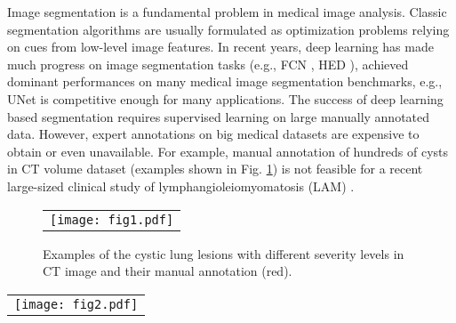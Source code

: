\documentclass{article}
\begin{document}
Image segmentation is a fundamental problem in medical image analysis. Classic segmentation algorithms \cite{sonka2014image} are usually formulated as optimization problems relying on cues from low-level image features. %
In recent years, deep learning has made much progress on image segmentation tasks (e.g., FCN \cite{long2015fully}, HED \cite{xie2015holistically}), achieved dominant performances on many medical image segmentation benchmarks, e.g., UNet \cite{ronneberger2015u} is competitive enough for many applications. %
The success of deep learning based segmentation requires supervised learning on large manually annotated data. However, expert annotations on big medical datasets are expensive to obtain or even unavailable. %
For example, %
manual annotation of hundreds of cysts in CT volume dataset (examples shown in Fig. \ref{figannotation}) is not feasible for a recent large-sized clinical study of lymphangioleiomyomatosis (LAM) \cite{yao2014sustained}. %

   \begin{figure}[!t]
   \begin{center}
   \begin{tabular}{c}
   \texttt{[image: fig1.pdf]}
   \end{tabular}
   \end{center}
   \caption[example]{ \label{figannotation} 
Examples of the cystic lung lesions with different severity levels in CT image and their manual annotation (red). 
}
   \end{figure} 

   \begin{figure*}[!t]
   \begin{center}
   \begin{tabular}{c}
   \texttt{[image: fig2.pdf]}
   \end{tabular}
   \end{center}
   \caption[example]{ \label{figframework} 
Learning to segment medical images without manual annotation. Segmentation networks (level 1 -- level $n$) are recursively trained with the previous network segmentation as training labels.
}
   \end{figure*} 
\end{document}
